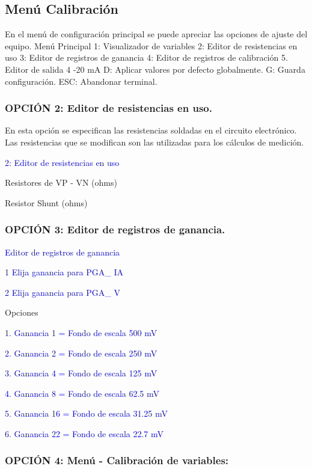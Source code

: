 \subsection{Menú Calibración}
En el menú de configuración principal se puede apreciar las opciones de ajuste del equipo.  
Menú Principal
1: Visualizador de variables
2: Editor de resistencias en uso
3: Editor de registros de ganancia
4: Editor de registros de calibración
5. Editor de salida 4 -20 mA
D: Aplicar valores por defecto globalmente.
G: Guarda configuración.
ESC: Abandonar terminal.

\subsubsection{OPCIÓN 2: Editor de resistencias en uso.}

En esta opción se especifican las resistencias soldadas en el circuito electrónico. Las resistencias que se modifican son las utilizadas para los cálculos de medición.


\textcolor{blue}{2: Editor de resistencias en uso}

Resistores de VP - VN (ohms)

Resistor Shunt (ohms)


\subsubsection{OPCIÓN 3: Editor de registros de ganancia.}
\textcolor{blue}{ Editor de registros de ganancia}

\textcolor{blue}{1 Elija ganancia para PGA\_ IA}

\textcolor{blue}{2 Elija ganancia para PGA\_ V}

Opciones

\textcolor{blue}{1. Ganancia 1  = Fondo de escala 500   mV}

\textcolor{blue}{2. Ganancia 2  = Fondo de escala 250   mV}

\textcolor{blue}{3. Ganancia 4  = Fondo de escala 125   mV}

\textcolor{blue}{4. Ganancia 8  = Fondo de escala 62.5  mV}

\textcolor{blue}{5. Ganancia 16 = Fondo de escala 31.25 mV}

\textcolor{blue}{6. Ganancia 22 = Fondo de escala 22.7  mV}

\subsubsection{OPCIÓN 4: Menú - Calibración de variables:}

